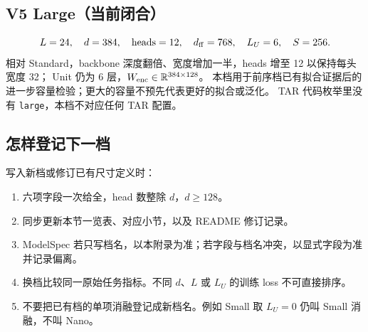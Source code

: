 \documentclass[11pt,UTF8,fontset=fandol]{ctexart}
\numberwithin{equation}{section}
\theoremstyle{definition}
\newcommand{\R}{\mathbb R}
\begin{document}
\subsection{V5 Large（当前闭合）}
\label{v54:subsec:size-large}
\begin{equation}
 L=24,\quad d=384,\quad \mathrm{heads}=12,\quad
 d_{\rm ff}=768,\quad L_U=6,\quad S=256.
 \label{v54:eq:v5-large}
\end{equation}
相对 Standard，backbone 深度翻倍、宽度增加一半，heads 增至 12 以保持每头宽度 32；
Unit 仍为 6 层，$W_{\rm enc}\in\R^{384\times128}$。
本档用于前序档已有拟合证据后的进一步容量检验；更大的容量不预先代表更好的拟合或泛化。
TAR 代码枚举里没有 \texttt{large}，本档不对应任何 TAR 配置。

\subsection{怎样登记下一档}
写入新档或修订已有尺寸定义时：
\begin{enumerate}
\item 六项字段一次给全，head 数整除 $d$，$d\ge 128$。
\item 同步更新本节一览表、对应小节，以及 README 修订记录。
\item ModelSpec 若只写档名，以本附录为准；若字段与档名冲突，以显式字段为准并记录偏离。
\item 换档比较同一原始任务指标。不同 $d$、$L$ 或 $L_U$ 的训练 loss 不可直接排序。
\item 不要把已有档的单项消融登记成新档名。例如 Small 取 $L_U=0$ 仍叫 Small 消融，不叫 Nano。
\end{enumerate}
\end{document}
